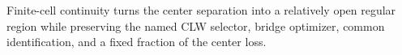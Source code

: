 Finite-cell continuity turns the center separation into a relatively open regular region while preserving the named CLW selector, bridge optimizer, common identification, and a fixed fraction of the center loss.